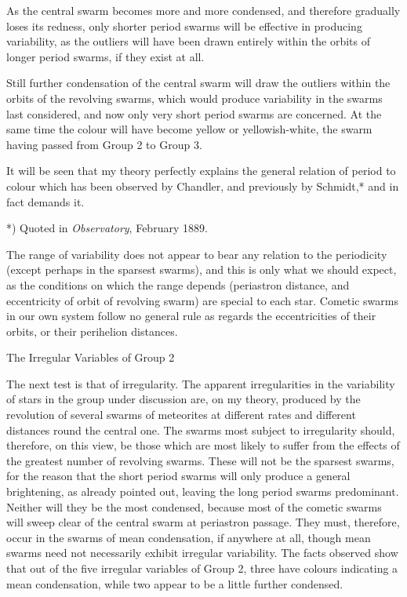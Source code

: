 \documentclass[a4paper, 12pt, oneside, polutonikogreek, english]{article}
\begin{document}
As the central swarm becomes more and more condensed, and therefore gradually loses its redness, only shorter period swarms will be effective in producing variability, as the outliers will have been drawn entirely within the orbits of longer period swarms, if they exist at all.

Still further condensation of the central swarm will draw the outliers within the orbits of the revolving swarms, which would produce variability in the swarms last considered, and now only very short period swarms are concerned. At the same time the colour will have become yellow or yellowish-white, the swarm having passed from Group 2 to Group 3.

It will be seen that my theory perfectly explains the general relation of period to colour which has been observed by Chandler, and previously by Schmidt,* and in fact demands it.

*) Quoted in \emph{Observatory}, February 1889.

The range of variability does not appear to bear any relation to the periodicity (except perhaps in the sparsest swarms), and this is only what we should expect, as the conditions on which the range depends (periastron distance, and eccentricity of orbit of revolving swarm) are special to each star. Cometic swarms in our own system follow no general rule as regards the eccentricities of their orbits, or their perihelion distances.

The Irregular Variables of Group 2

The next test is that of irregularity. The apparent irregularities in the variability of stars in the group under discussion are, on my theory, produced by the revolution of several swarms of meteorites at different rates and different distances round the central one. The swarms most subject to irregularity should, therefore, on this view, be those which are most likely to suffer from the effects of the greatest number of revolving swarms. These will not be the sparsest swarms, for the reason that the short period swarms will only produce a general brightening, as already pointed out, leaving the long period swarms predominant. Neither will they be the most condensed, because most of the cometic swarms will sweep clear of the central swarm at periastron passage. They must, therefore, occur in the swarms of mean condensation, if anywhere at all, though mean swarms need not necessarily exhibit irregular variability. The facts observed show that out of the five irregular variables of Group 2, three have colours indicating a mean condensation, while two appear to be a little further condensed.
\end{document}
